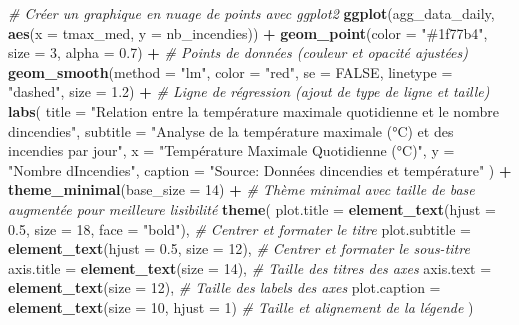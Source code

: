 \documentclass[
]{article}
\newenvironment{Shaded}{\begin{snugshade}}{\end{snugshade}}
\newcommand{\AttributeTok}[1]{\textcolor[rgb]{0.13,0.29,0.53}{#1}}
\newcommand{\CommentTok}[1]{\textcolor[rgb]{0.56,0.35,0.01}{\textit{#1}}}
\newcommand{\ConstantTok}[1]{\textcolor[rgb]{0.56,0.35,0.01}{#1}}
\newcommand{\DecValTok}[1]{\textcolor[rgb]{0.00,0.00,0.81}{#1}}
\newcommand{\FloatTok}[1]{\textcolor[rgb]{0.00,0.00,0.81}{#1}}
\newcommand{\FunctionTok}[1]{\textcolor[rgb]{0.13,0.29,0.53}{\textbf{#1}}}
\newcommand{\NormalTok}[1]{#1}
\newcommand{\SpecialCharTok}[1]{\textcolor[rgb]{0.81,0.36,0.00}{\textbf{#1}}}
\newcommand{\StringTok}[1]{\textcolor[rgb]{0.31,0.60,0.02}{#1}}
\begin{document}
\begin{Shaded}
\begin{Highlighting}[]
\CommentTok{\# Créer un graphique en nuage de points avec ggplot2}
\FunctionTok{ggplot}\NormalTok{(agg\_data\_daily, }\FunctionTok{aes}\NormalTok{(}\AttributeTok{x =}\NormalTok{ tmax\_med, }\AttributeTok{y =}\NormalTok{ nb\_incendies)) }\SpecialCharTok{+}
  \FunctionTok{geom\_point}\NormalTok{(}\AttributeTok{color =} \StringTok{"\#1f77b4"}\NormalTok{, }\AttributeTok{size =} \DecValTok{3}\NormalTok{, }\AttributeTok{alpha =} \FloatTok{0.7}\NormalTok{) }\SpecialCharTok{+}  \CommentTok{\# Points de données (couleur et opacité ajustées)}
  \FunctionTok{geom\_smooth}\NormalTok{(}\AttributeTok{method =} \StringTok{"lm"}\NormalTok{, }\AttributeTok{color =} \StringTok{"red"}\NormalTok{, }\AttributeTok{se =} \ConstantTok{FALSE}\NormalTok{, }\AttributeTok{linetype =} \StringTok{"dashed"}\NormalTok{, }\AttributeTok{size =} \FloatTok{1.2}\NormalTok{) }\SpecialCharTok{+}  \CommentTok{\# Ligne de régression (ajout de type de ligne et taille)}
  \FunctionTok{labs}\NormalTok{(}
    \AttributeTok{title =} \StringTok{"Relation entre la température maximale quotidienne et le nombre d\textquotesingle{}incendies"}\NormalTok{,}
    \AttributeTok{subtitle =} \StringTok{"Analyse de la température maximale (°C) et des incendies par jour"}\NormalTok{,}
    \AttributeTok{x =} \StringTok{"Température Maximale Quotidienne (°C)"}\NormalTok{,}
    \AttributeTok{y =} \StringTok{"Nombre d\textquotesingle{}Incendies"}\NormalTok{,}
    \AttributeTok{caption =} \StringTok{"Source: Données d\textquotesingle{}incendies et température"}
\NormalTok{  ) }\SpecialCharTok{+}
  \FunctionTok{theme\_minimal}\NormalTok{(}\AttributeTok{base\_size =} \DecValTok{14}\NormalTok{) }\SpecialCharTok{+}  \CommentTok{\# Thème minimal avec taille de base augmentée pour meilleure lisibilité}
  \FunctionTok{theme}\NormalTok{(}
    \AttributeTok{plot.title =} \FunctionTok{element\_text}\NormalTok{(}\AttributeTok{hjust =} \FloatTok{0.5}\NormalTok{, }\AttributeTok{size =} \DecValTok{18}\NormalTok{, }\AttributeTok{face =} \StringTok{"bold"}\NormalTok{),  }\CommentTok{\# Centrer et formater le titre}
    \AttributeTok{plot.subtitle =} \FunctionTok{element\_text}\NormalTok{(}\AttributeTok{hjust =} \FloatTok{0.5}\NormalTok{, }\AttributeTok{size =} \DecValTok{12}\NormalTok{),               }\CommentTok{\# Centrer et formater le sous{-}titre}
    \AttributeTok{axis.title =} \FunctionTok{element\_text}\NormalTok{(}\AttributeTok{size =} \DecValTok{14}\NormalTok{),                                }\CommentTok{\# Taille des titres des axes}
    \AttributeTok{axis.text =} \FunctionTok{element\_text}\NormalTok{(}\AttributeTok{size =} \DecValTok{12}\NormalTok{),                                 }\CommentTok{\# Taille des labels des axes}
    \AttributeTok{plot.caption =} \FunctionTok{element\_text}\NormalTok{(}\AttributeTok{size =} \DecValTok{10}\NormalTok{, }\AttributeTok{hjust =} \DecValTok{1}\NormalTok{)                    }\CommentTok{\# Taille et alignement de la légende}
\NormalTok{  )}
\end{Highlighting}
\end{Shaded}
\end{document}
